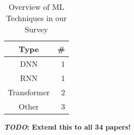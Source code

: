 \documentclass[conference]{IEEEtran}
\newcommand{\TODO}[1]{\textbf{\textcolor{Bittersweet}{#1}}\xspace}
\newcommand{\TODOM}[1]{\TODO{\emph{TODO}: #1}\xspace}
\begin{document}
\begin{table}[h]
    \centering
    \caption{Overview of \acs{ML} Techniques in our Survey}
    \label{tab:Overview-of-ML-Techniques-in-our-Survey}
    \begin{tabular}{cr} \toprule
        Type        & \# \\ \midrule
        \ac{DNN}    & 1 \\
        \ac{RNN}    & 1 \\
        Transformer & 2 \\
        Other       & 3 \\ \bottomrule
    \end{tabular}

    \vspace{3mm}\TODOM{Extend this to all 34 papers!}
\end{table}





\end{document}
